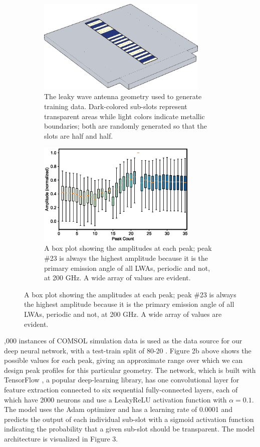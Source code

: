 \documentclass[11pt]{article}
\begin{document}
\begin{figure}[H]
	\caption{Simulation geometry (left) and possible peak profiles (right)}
	\begin{subfigure}[b]{0.45\textwidth}
		\centering
		\includegraphics[width = 3.2in]{figures/fig5.eps}
		\caption{The leaky wave antenna geometry used to generate training data. Dark-colored sub-slots represent transparent areas while light colors indicate metallic boundaries; both are randomly generated so that the slots are half and half.}
	\end{subfigure}
	\begin{subfigure}[b]{0.55\textwidth}
		\centering
		\includegraphics[width=3in]{figures/fig2new.eps}

		\caption{A box plot showing the amplitudes at each peak; peak \#23 is always the highest amplitude because it is the primary emission angle of all LWAs, periodic and not, at 200 GHz. A wide array of values are evident.}
	\end{subfigure}

\end{figure}


,000 instances of COMSOL simulation data is used as the data source for our deep neural network, with a test-train split of 80-20 \cite{molecules26041111}. Figure 2b above shows the possible values for each peak, giving an approximate range over which we can design peak profiles for this particular geometry. The network, which is built with TensorFlow \cite{tensorflow2015-whitepaper}, a popular deep-learning library, has one convolutional layer for feature extraction connected to six sequential fully-connected layers, each of which have 2000 neurons and use a LeakyReLU activation function with $\alpha = 0.1$. The model uses the Adam optimizer and has a learning rate of 0.0001 and predicts the output of each individual sub-slot with a sigmoid activation function indicating the probability that a given sub-slot should be transparent. The model architecture is visualized in Figure 3. \\
\end{document}
